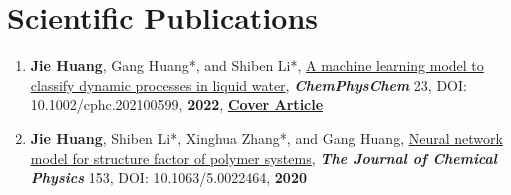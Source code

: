 \documentclass[a4paper,10pt]{article} %
\begin{document}
\section{Scientific Publications}  

\begin{enumerate}

\item \textbf{Jie Huang}, Gang Huang*, and Shiben Li*, \href{https://chemistry-europe.onlinelibrary.wiley.com/doi/abs/10.1002/cphc.202100599}{A machine learning model to classify dynamic processes in liquid water},   \textbf{\emph{ChemPhysChem}} 23, DOI: 10.1002/cphc.202100599,  \textbf{2022}, \href{https://cdn.jsdelivr.net/gh/HuangJiaLian/DataBase0@master/uPic/2022_01_05_16_CoverProfile.pdf}{\textbf{Cover Article}}


\item \textbf{Jie Huang}, Shiben Li*, Xinghua Zhang*, and Gang Huang, \href{https://aip.scitation.org/doi/10.1063/5.0022464}{Neural network model for structure factor of polymer systems},  \textbf{\emph{The Journal of Chemical Physics}} 153, DOI: 10.1063/5.0022464, \textbf{2020}
\end{enumerate}
\ 

\end{document}

